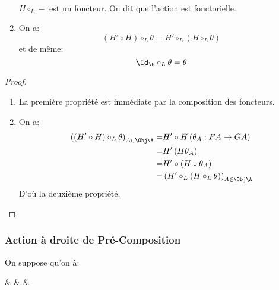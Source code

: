 \documentclass[math, info]{cours}
\begin{document}
\begin{proposition}
\begin{enumerate}
\begin{equation*}
\begin{array}{rcl}
			      \end{array}
		      \end{equation*}
		      $H \circ_{L} -$ est un foncteur. On dit que l'action est fonctorielle.
		\item On a:
		      \begin{equation*}
			      \left(H'\circ H\right)\circ_{L}\theta = H'\circ_{L}\left(H\circ_{L}\theta\right)
		      \end{equation*}
		      et de même:
		      \begin{equation*}
			      \Id_{\B}\circ_{L}\theta = \theta
		      \end{equation*}
	\end{enumerate}
	\label{prop:transfocomp}
\end{proposition}
\begin{proof}
	\begin{enumerate}
		\item La première propriété est immédiate par la composition des foncteurs.
		\item On a:
		      \begin{equation*}
			      \begin{aligned}
				      \left( \left( H'\circ H \right) \circ_{L} \theta \right)_{A\in \Obj\A} = & H'\circ H\left(\theta_{A}: FA\to GA\right)                                \\
				      =                                                                        & H'\left(H\theta_{A}\right)                                                \\
				      =                                                                        & H'\circ \left(H\circ \theta_{A}\right)                                    \\
				      =                                                                        & \left( H'\circ_{L}\left( H \circ_{L} \theta \right) \right)_{A\in \Obj\A}
			      \end{aligned}
		      \end{equation*}
		      D'où la deuxième propriété.
	\end{enumerate}
\end{proof}

\subsubsection{Action à droite de Pré-Composition}
On suppose qu'on à:
\begin{category}[]
	\A\arrow[r, "H"] & \B\arrow[bend left, rr, "G" name=U]\arrow[bend right, rr, "F"{swap, name=D}] & & \cont{}
\end{category}
\end{document}
